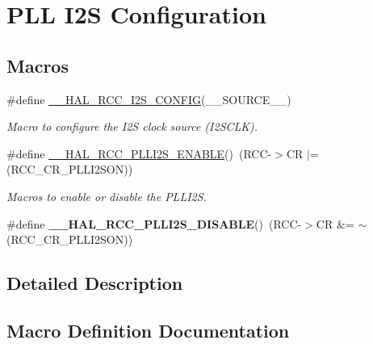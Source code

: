 \hypertarget{group___r_c_c___p_l_l___i2_s___configuration}{}\section{P\+LL I2S Configuration}
\label{group___r_c_c___p_l_l___i2_s___configuration}
\subsection*{Macros}
\begin{DoxyCompactItemize}
\item 
\#define \mbox{\hyperlink{group___r_c_c___p_l_l___i2_s___configuration_ga3927ddd738bac3fe4d99a277e1d5830f}{\+\_\+\+\_\+\+H\+A\+L\+\_\+\+R\+C\+C\+\_\+\+I2\+S\+\_\+\+C\+O\+N\+F\+IG}}(\+\_\+\+\_\+\+S\+O\+U\+R\+C\+E\+\_\+\+\_\+)
\begin{DoxyCompactList}\small\item\em Macro to configure the I2S clock source (I2\+S\+C\+LK). \end{DoxyCompactList}\item 
\#define \mbox{\hyperlink{group___r_c_c___p_l_l___i2_s___configuration_ga397893a952906f8caa8579a56c3a17a6}{\+\_\+\+\_\+\+H\+A\+L\+\_\+\+R\+C\+C\+\_\+\+P\+L\+L\+I2\+S\+\_\+\+E\+N\+A\+B\+LE}}()~(R\+CC-\/$>$CR $\vert$= (R\+C\+C\+\_\+\+C\+R\+\_\+\+P\+L\+L\+I2\+S\+ON))
\begin{DoxyCompactList}\small\item\em Macros to enable or disable the P\+L\+L\+I2S. \end{DoxyCompactList}\item 
\mbox{\label{group___r_c_c___p_l_l___i2_s___configuration_ga44da2cd20aaa56a79141f6142dfb6942}} 
\#define {\bfseries \+\_\+\+\_\+\+H\+A\+L\+\_\+\+R\+C\+C\+\_\+\+P\+L\+L\+I2\+S\+\_\+\+D\+I\+S\+A\+B\+LE}()~(R\+CC-\/$>$CR \&= $\sim$(R\+C\+C\+\_\+\+C\+R\+\_\+\+P\+L\+L\+I2\+S\+ON))
\end{DoxyCompactItemize}


\subsection{Detailed Description}


\subsection{Macro Definition Documentation}
\mbox{\label{group___r_c_c___p_l_l___i2_s___configuration_ga3927ddd738bac3fe4d99a277e1d5830f}} 
